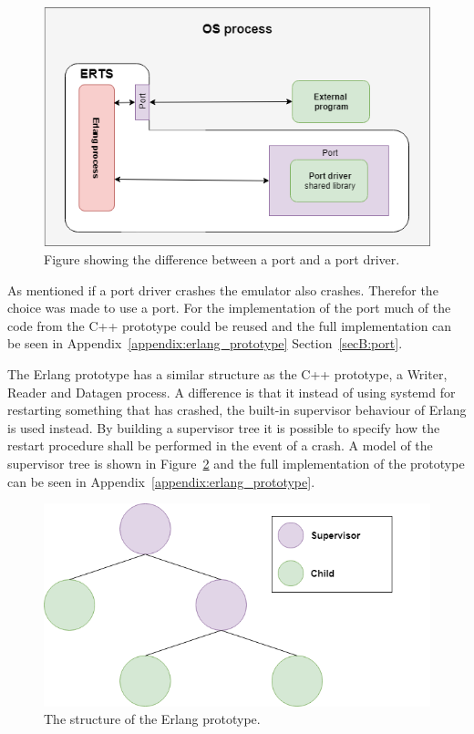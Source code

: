 \begin{figure}[H]
\centering
\includegraphics[scale=0.77]{figure/port_portdriver.png}
\caption{Figure showing the difference between a port and a port driver.}
\label{fig:erlang_run_ccode}
\end{figure}

As mentioned if a port driver crashes the emulator also crashes. Therefor the choice was made to use a port. For the implementation of the port much of the code from the C++ prototype could be reused and the full implementation can be seen in Appendix~\ref{appendix:erlang_prototype} Section~\ref{secB:port}.

The Erlang prototype has a similar structure as the C++ prototype, a Writer, Reader and Datagen process. A difference is that it instead of using systemd for restarting something that has crashed, the built-in supervisor behaviour of Erlang is used instead. By building a supervisor tree it is possible to specify how the restart procedure shall be performed in the event of a crash. A model of the supervisor tree is shown in Figure~\ref{fig:erlang_structure_prototype} and the full implementation of the prototype can be seen in Appendix~\ref{appendix:erlang_prototype}.

\begin{figure}[H]
\centering
\includegraphics[scale=0.65]{figure/erlang_structure_prototype.png}
\caption{The structure of the Erlang prototype.}
\label{fig:erlang_structure_prototype}
\end{figure}

